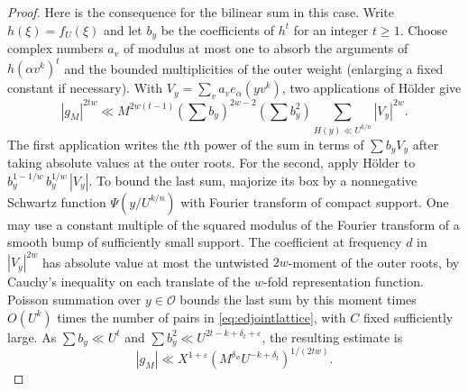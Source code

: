 \documentclass[11pt,letterpaper]{article}
\theoremstyle{definition}
\numberwithin{equation}{section}
\begin{document}
\begin{proof}
Here is the consequence for the bilinear sum in this case. Write
$h(\xi)=f_U(\xi)$ and let $b_y$ be the coefficients of $h^t$ for an
integer $t\ge1$. Choose complex numbers $a_v$ of modulus at most one
to absorb the arguments of $h(\alpha v^k)^t$ and the bounded
multiplicities of the outer weight (enlarging a fixed constant if
necessary). With $V_y=\sum_v a_v e_\alpha(yv^k)$, two applications
of H\"older give
\[
 |g_M|^{2tw}\ll M^{2w(t-1)}
       \left(\sum b_y\right)^{2w-2}
       \left(\sum b_y^2\right)
       \sum_{H(y)\ll U^{k/n}} |V_y|^{2w}.
\]
The first application writes the $t$th power of the sum in terms of
$\sum b_y V_y$ after taking absolute values at the outer roots.
For the second, apply H\"older to
$b_y^{1-1/w}\,b_y^{1/w}\,|V_y|$.
To bound the last sum, majorize its box by a nonnegative Schwartz
function $\Psi(y/U^{k/n})$ with Fourier transform of compact support.
One may use a constant multiple of the squared modulus of the Fourier
transform of a smooth bump of sufficiently small support. The
coefficient at frequency $d$ in $|V_y|^{2w}$ has absolute value at
most the untwisted $2w$-moment of the outer roots, by Cauchy's
inequality on each translate of the $w$-fold representation function.
Poisson summation over $y\in\mathcal O$ bounds the last sum by this
moment times $O(U^k)$ times the number of pairs in
\eqref{eq:edjointlattice}, with $C$ fixed sufficiently large.
As $\sum b_y\ll U^t$ and $\sum b_y^2\ll U^{2t-k+\delta_t+\varepsilon}$,
the resulting estimate is
\begin{equation}\label{eq:edlargeasym}
 |g_M|\ll X^{1+\varepsilon}
     \left(M^{\delta_w}U^{-k+\delta_t}\right)^{1/(2tw)}.
\end{equation}


\end{proof}
\end{document}
